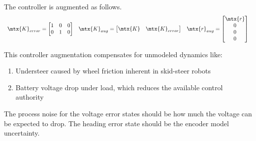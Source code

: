 The controller is augmented as follows.
\begin{equation}
  \begin{array}{ccc}
    \mtx{K}_{error} =
    \begin{bmatrix}
      1 & 0 & 0 \\
      0 & 1 & 0
    \end{bmatrix} &
    \mtx{K}_{aug} = \begin{bmatrix}
      \mtx{K} & \mtx{K}_{error}
    \end{bmatrix} &
    \mtx{r}_{aug} = \begin{bmatrix}
      \mtx{r} \\
      0 \\
      0 \\
      0
    \end{bmatrix}
  \end{array}
\end{equation}

This controller augmentation compensates for unmodeled dynamics like:
\begin{enumerate}
  \item Understeer caused by wheel friction inherent in skid-steer robots
  \item Battery voltage drop under load, which reduces the available control
    authority
\end{enumerate}
\begin{remark}
  The process noise for the voltage error states should be how much the voltage
  can be expected to drop. The heading error state should be the encoder
  \gls{model} uncertainty.
\end{remark}
